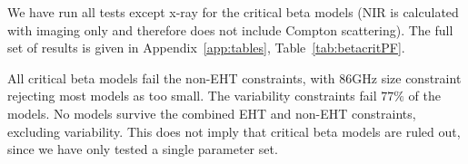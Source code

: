We have run all tests except x-ray for the critical beta models (NIR is calculated with imaging only and therefore does not include Compton scattering).  The full set of results is given in Appendix~\ref{app:tables}, Table~\ref{tab:betacritPF}.

All critical beta models fail the non-EHT constraints, with 86GHz size constraint rejecting most models as too small.  The variability constraints fail $77\%$ of the models.  No models survive the combined EHT and non-EHT constraints, excluding variability.  This does not imply that critical beta models are ruled out, since we have only tested a single parameter set.




